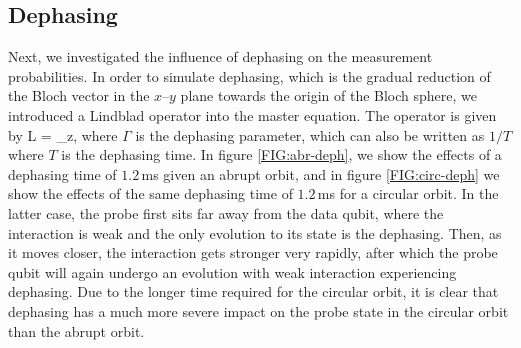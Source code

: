 \subsection{Dephasing}\label{sec:dephasing}
Next, we investigated the influence of dephasing on the measurement probabilities. In order to simulate dephasing, which is the gradual reduction of the Bloch vector in the $x$--$y$ plane towards the origin of the Bloch sphere, we introduced a Lindblad operator into the master equation. The operator is given by 
\beq
L  = \sqrt{\Gamma} \sigma_z,
\eeq
where $\Gamma$ is the dephasing parameter, which can also be written as $1/T$ where $T$ is the dephasing time. In figure \ref{FIG:abr-deph}, we show the effects of a dephasing time of $1.2\, $ms given an abrupt orbit, and in figure \ref{FIG:circ-deph} we show the effects of the same dephasing time of $1.2\, $ms for a circular orbit. In the latter case, the probe first sits far away from the data qubit, where the interaction is weak and the only evolution to its state is the dephasing. Then, as it moves closer, the interaction gets stronger very rapidly, after which the probe qubit will again undergo an evolution with weak interaction experiencing dephasing. Due to the longer time required for the circular orbit, it is clear that dephasing has a much more severe impact on the probe state in the circular orbit than the abrupt orbit. 

